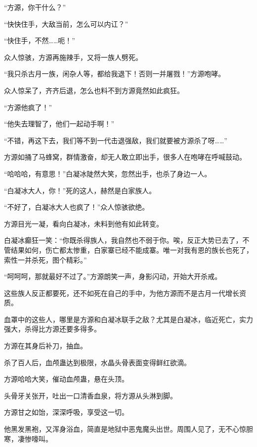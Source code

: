 
\begin{this_body}



“方源，你干什么？”

“快快住手，大敌当前，怎么可以内讧？”

“快住手，不然……呃！”

众人惊骇，方源再施辣手，又将一族人劈死。

“我只杀古月一族，闲杂人等，都给我退下！否则一并屠戮！”方源咆哮。

众人惊呆了，齐齐后退，怎么也料不到方源竟然如此疯狂。

“方源他疯了！”

“他失去理智了，他们一起动手啊！”

“不错，再这下去，我们等不到一代击退强敌，我们就要被方源杀了呀……”

方源如捅了马蜂窝，群情激奋，却无人敢立即出手，很多人在咆哮在呼喊鼓动。

“哈哈哈，有意思！”白凝冰陡然大笑，忽然出手，也杀了身边一人。

“白凝冰大人，你！”死的这人，赫然是白家族人。

“不好了，白凝冰大人也疯了！”众人惊骇欲绝。

方源目光一凝，看向白凝冰，未料到他有如此转变。

白凝冰癫狂一笑：“你既杀得族人，我自然也不弱于你。唉，反正大势已去了，不管结果如何，伤亡都太惨重，白家寨已经不能成寨。唯一对我有恩的族长也死了，索性一并杀死，图个精彩。”

“呵呵呵，那就最好不过了。”方源朗笑一声，身影闪动，开始大开杀戒。

这些族人反正都要死，还不如死在自己的手中，为他方源而不是古月一代增长资质。

血罩中的这些人，哪里是方源和白凝冰联手之敌？尤其是白凝冰，临近死亡，实力强大，杀得比方源还要多得多。

方源在其身后补刀，抽血。

杀了百人后，血颅蛊达到极限，水晶头骨表面变得鲜红欲滴。

方源哈哈大笑，催动血颅蛊，悬在头顶。

头骨牙关张开，吐出一口清香血泉，将方源从头淋到脚。

方源甘之如饴，深深呼吸，享受这一切。

他黑发黑袍，又浑身浴血，简直是地狱中恶鬼魔头出世。周围人见了，无不心惊胆寒，凄惨嚎叫。


\end{this_body}
